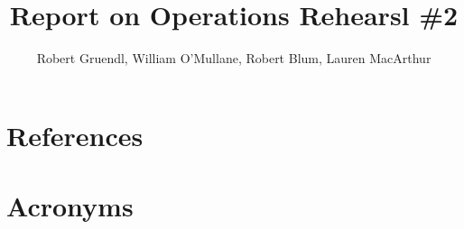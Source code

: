 \documentclass[DM,authoryear,toc]{lsstdoc}
\title{Report on Operations Rehearsl \#2}
\author{%
Robert Gruendl, William O'Mullane, Robert Blum, Lauren MacArthur
}
\date{\vcsDate}
\begin{document}
\mkshorttitle %




\appendix
\section{References} \label{sec:bib}
\renewcommand{\refname}{} %


\section{Acronyms} \label{sec:acronyms}

\end{document}
